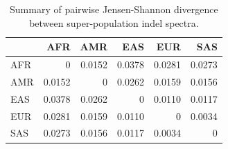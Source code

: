 \documentclass[11pt,a4paper]{article}
\begin{document}
\begin{table}[H]
\centering
\caption{Summary of pairwise Jensen-Shannon divergence between super-population indel spectra.}
\label{tab:jsd}
\begin{tabular}{lrrrrr}
\toprule
 & AFR & AMR & EAS & EUR & SAS \\
\midrule
AFR & 0 & 0.0152 & 0.0378 & 0.0281 & 0.0273 \\
AMR & 0.0152 & 0 & 0.0262 & 0.0159 & 0.0156 \\
EAS & 0.0378 & 0.0262 & 0 & 0.0110 & 0.0117 \\
EUR & 0.0281 & 0.0159 & 0.0110 & 0 & 0.0034 \\
SAS & 0.0273 & 0.0156 & 0.0117 & 0.0034 & 0 \\
\bottomrule
\end{tabular}
\end{table}
\end{document}
